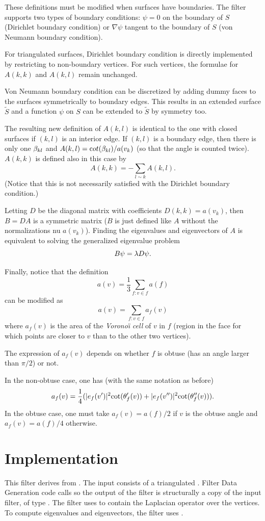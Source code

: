 \documentclass{InsightArticle}
\begin{document}
These definitions must be modified when surfaces have
boundaries. The filter supports two types of boundary conditions:
$\psi  = 0$ on the boundary of $S$ (Dirichlet boundary condition) or
$\nabla \psi$ tangent to the boundary of $S$ (von Neumann boundary
condition). 

For triangulated surfaces, Dirichlet boundary condition is directly
implemented by restricting to non-boundary vertices. For such
vertices, the formulae for $A(k,k)$ and $A(k,l)$ remain unchanged.

Von Neumann boundary condition can be discretized by adding dummy
faces to the surfaces symmetrically to boundary edges. This results
in an extended surface $\tilde S$ and a function $\psi$ on $S$ can be
extended to $\tilde S$ by symmetry too. 

The resulting new definition of $A(k,l)$ is identical to the one with
closed surfaces if $(k,l)$ is an interior edge. If $(k,l)$ is a
boundary edge, then there is only one $\beta_{kl}$ and $A(k,l) = 
{\mathrm cot}(\beta_{kl}) /a(v_k)$ (so that the angle is counted twice). $A(k,k)$ is defined also in this
case by
\[
A(k,k) = - \sum_{l \sim k}  A(k,l).
\]
(Notice that this is not necessarily satisfied with the
Dirichlet boundary condition.)

\bigskip

Letting $D$ be the diagonal matrix with coefficients $D(k,k) = a(v_k)$,
then $B = DA$  is a symmetric matrix ($B$ is just defined like $A$
without the normalizations nu $a(v_k)$). Finding the eigenvalues and
eigenvectors of $A$ is equivalent to solving the generalized
eigenvalue problem
\[
B\psi = \lambda D\psi.
\]

Finally, notice that the definition
\[
a(v) = \frac13 \sum_{f:v\in f} a(f)
\]
can be modified as
\[
a(v) = \sum_{f:v\in f} a_f(v)
\]
where $a_f(v)$ is the area of the {\em Vorono\"\i<F9>} {\em cell} of $v$ in
$f$ (region in the face for which points are closer to $v$ than to
the other two vertices).

The expression of $a_f(v)$ depends on whether $f$ is obtuse (has an
angle larger than $\pi/2$) or not.

In the non-obtuse case, one has (with the same notation as before)
\[
a_f(v) = \frac14 (|e_f(v')|^2 \mathrm{cot}(\theta'_f(v)) + |e_f(v'')|^2
\mathrm{cot}(\theta''_f(v))).
\] 
In the obtuse case, one must take
$a_f(v) = a(f)/2$ if $v$ is the obtuse angle and $a_f(v) = a(f)/4$ otherwise.

\section{Implementation}
This filter derives from .  The input 
consists of a triangulated .  Filter Data Generation code
calls  so the output of the filter is
structurally a copy of the input filter, of type .
The filter uses  to contain the Laplacian
operator over the vertices.  To compute eigenvalues and eigenvectors, the
filter uses .
\end{document}
